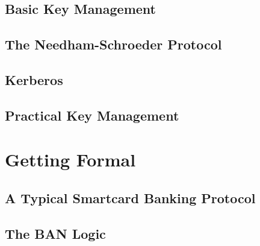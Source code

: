 	\subsection{Basic Key Management}

	\subsection{The Needham-Schroeder Protocol}

	\subsection{Kerberos}

	\subsection{Practical Key Management}

\section{Getting Formal}

	\subsection{A Typical Smartcard Banking Protocol}

	\subsection{The BAN Logic}



